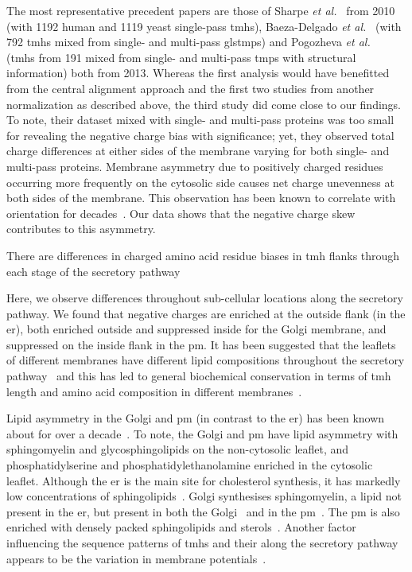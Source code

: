 \begin{enumerate}[i]
\end{enumerate}

The most representative precedent papers are those of Sharpe \textit{et al.}~\cite{Sharpe2010} from 2010 (with 1192 human and 1119 yeast single-pass \gls{tmh}s), Baeza-Delgado \textit{et al.}~\cite{Baeza-Delgado2013} (with 792 \gls{tmh}s mixed from single- and multi-pass gls{tmp}s) and Pogozheva \textit{et al.}~\cite{Pogozheva2013} (\gls{tmh}s from 191 mixed from single- and multi-pass \gls{tmp}s with structural information) both from 2013. Whereas the first analysis would have benefitted from the central alignment approach and the first two studies from another normalization as described above, the third study did come close to our findings. To note, their dataset mixed with single- and multi-pass proteins was too small for revealing the negative charge bias with significance; yet, they observed total charge differences at either sides of the membrane varying for both single- and multi-pass proteins. Membrane asymmetry due to positively charged residues occurring more frequently on the cytosolic side causes net charge unevenness at both sides of the membrane. This observation has been known to correlate with orientation for decades~\cite{VonHeijne1989, Baeza-Delgado2013, Meindl-Beinker2006}. Our data shows that the negative charge skew contributes to this asymmetry.

There are differences in charged amino acid residue biases in \gls{tmh} flanks through each stage of the secretory pathway

Here, we observe differences throughout sub-cellular locations along the secretory pathway. We found that negative charges are enriched at the outside flank (in the \gls{er}), both enriched outside and suppressed inside for the Golgi membrane, and suppressed on the inside flank in the \gls{pm}. It has been suggested that the leaflets of different membranes have different lipid compositions throughout the secretory pathway~\cite{VanMeer2008} and this has led to general biochemical conservation in terms of \gls{tmh} length and amino acid composition in different membranes~\cite{Sharpe2010, Pogozheva2013}.

Lipid asymmetry in the Golgi and \gls{pm} (in contrast to the \gls{er}) has been known about for over a decade~\cite{Daleke2007, Devaux2004}. To note, the Golgi and \gls{pm} have lipid asymmetry with sphingomyelin and glycosphingolipids on the non-cytosolic leaflet, and phosphatidylserine and phosphatidylethanolamine enriched in the cytosolic leaflet. Although the \gls{er} is the main site for cholesterol synthesis, it has markedly low concentrations of sphingolipids~\cite{Bell1981}. Golgi synthesises sphingomyelin, a lipid not present in the \gls{er}, but present in both the Golgi~\cite{Futerman2005} and in the \gls{pm}~\cite{Li2007, Tafesse2007}. The \gls{pm} is also enriched with densely packed sphingolipids and sterols~\cite{Paolo2006}. Another factor influencing the sequence patterns of \gls{tmh}s and their along the secretory pathway appears to be the variation in membrane potentials~\cite{Qin2011, Worley1994, Schapiro2000}.

